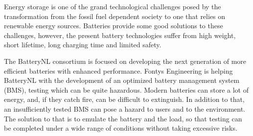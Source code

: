 Energy storage is one of the grand technological challenges posed by the transformation from the fossil fuel dependent society to one that relies on renewable energy sources. Batteries provide some good solutions to these challenges, however, the present battery technologies suffer from high weight, short lifetime, long charging time and limited safety. 

The BatteryNL consortium is focused on developing the next generation of more efficient batteries with enhanced performance. Fontys Engineering is helping BatteryNL with the development of an optimized battery management system (BMS), testing which can be quite hazardous. Modern batteries can store a lot of energy, and, if they catch fire, can be difficult to extinguish. In addition to that, an insufficiently tested BMS can pose a hazard to users and to the environment. 
The solution to that is to emulate the battery and the load, so that testing can be completed under a wide range of conditions without taking excessive risks. 
